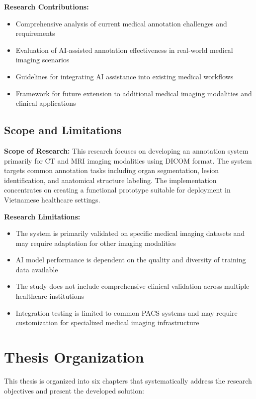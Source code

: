 \textbf{Research Contributions:}
\begin{itemize}
    \item Comprehensive analysis of current medical annotation challenges and requirements
    \item Evaluation of AI-assisted annotation effectiveness in real-world medical imaging scenarios
    \item Guidelines for integrating AI assistance into existing medical workflows
    \item Framework for future extension to additional medical imaging modalities and clinical applications
\end{itemize}

\subsection{Scope and Limitations}

\textbf{Scope of Research:}
This research focuses on developing an annotation system primarily for CT and MRI imaging modalities using DICOM format. The system targets common annotation tasks including organ segmentation, lesion identification, and anatomical structure labeling. The implementation concentrates on creating a functional prototype suitable for deployment in Vietnamese healthcare settings.

\textbf{Research Limitations:}
\begin{itemize}
    \item The system is primarily validated on specific medical imaging datasets and may require adaptation for other imaging modalities
    \item AI model performance is dependent on the quality and diversity of training data available
    \item The study does not include comprehensive clinical validation across multiple healthcare institutions
    \item Integration testing is limited to common PACS systems and may require customization for specialized medical imaging infrastructure
\end{itemize}

\section{Thesis Organization}

This thesis is organized into six chapters that systematically address the research objectives and present the developed solution:

